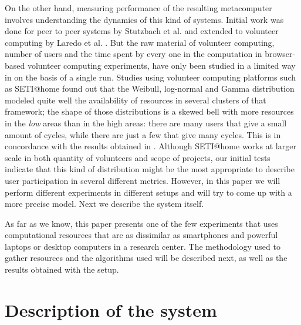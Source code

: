 \documentclass[journal,onecolumn]{IEEEtran}
\begin{document}
On the other hand, measuring performance of the resulting metacomputer
involves understanding the dynamics of this kind of systems. Initial
work was done for peer to peer systems by Stutzbach et
al. \cite{stutzbach2006understanding} and extended to volunteer
computing by Laredo et al. \cite{churn08,laredo2008rcp}. But the raw material of
volunteer computing, number of users and the time spent by every one in the
computation in browser-based volunteer computing experiments, have
only been studied in a limited way in 
\cite{DBLP:journals/gpem/LaredoBGVAGF14} on the basis of a single
run. Studies using volunteer computing platforms such as SETI@home
\cite{javadi2009mining} found out that the Weibull, log-normal and
Gamma distribution 
modeled quite well the availability of resources in several clusters
of that framework; the shape of those distributions is a skewed bell
with more resources in the {\em low} areas than in the high areas:
there are many users that give a small amount of cycles, while there
are just a few that give many cycles. This is in concordance with the
results obtained in \cite{agajaj}. Although SETI@home works
at larger scale in both quantity of volunteers and scope of projects, 
our initial tests indicate that
this kind of distribution might be the most appropriate to describe
user participation in several different metrics. However, in this
paper we will perform different experiments in different setups and
will try to come up with a more precise model. Next we describe the
system itself.


As far as we know, this paper presents one of the few experiments that
uses computational resources that are as dissimilar as smartphones and
powerful laptops 
or desktop computers in a research center. The methodology used to
gather resources and the algorithms used will be described next, as
well as the results obtained with the setup.

\section{Description of the system}
\label{sec:description}
\end{document}
